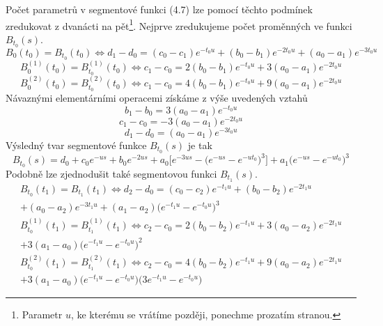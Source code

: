 \documentclass[a4paper]{book}
\begin{document}
Počet parametrů v segmentové funkci (4.7) lze pomocí těchto podmínek zredukovat z dvanácti na pět\footnote{Parametr $u$, ke kterému se vrátíme později, ponechme prozatím stranou.}. Nejprve zredukujeme počet proměnných ve funkci $B_{t_0}(s)$.
\begin{equation*}
B_0(t_0) = B_{t_0}(t_0) \Leftrightarrow d_1 - d_0 = (c_0 - c_1)e^{-t_0u} + (b_0 - b_1)e^{-2t_0u} + (a_0 - a_1)e^{-3t_0u}
\end{equation*}
\begin{equation*}
B_0^{(1)}(t_0) = B_{t_0}^{(1)}(t_0) \Leftrightarrow c_1 - c_0 = 2(b_0 - b_1)e^{-t_0u} + 3(a_0 - a_1)e^{-2t_0u}
\end{equation*}
\begin{equation*}
B_0^{(2)}(t_0) = B_{t_0}^{(2)}(t_0) \Leftrightarrow c_1 - c_0 = 4(b_0 - b_1)e^{-t_0u} + 9(a_0 - a_1)e^{-2t_0u}
\end{equation*}
Návaznými elementárními operacemi získáme z výše uvedených vztahů
\begin{equation*}
b_1 - b_0 = 3(a_0 - a_1)e^{-t_0u}
\end{equation*}
\begin{equation*}
c_1 - c_0 = -3(a_0 - a_1)e^{-2t_0u}
\end{equation*}
\begin{equation*}
d_1 - d_0 = (a_0 - a_1)e^{-3t_0u}
\end{equation*}
Výsledný tvar segmentové funkce $B_{t_0}(s)$ je tak
\begin{equation*}
B_{t_0}(s) = d_0 + c_0 e^{-us} + b_0e^{-2us} + a_0\Big[e^{-3us} - \Big(e^{-us} - e^{-ut_0} \Big)^3 \Big] + a_1\Big( e^{-us} - e^{-ut_0} \Big)^3
\end{equation*}
Podobně lze zjednodušit také segmentovou funkci $B_{t_1}(s)$.
\begin{equation*}
\begin{split}
B_{t_0}(t_1) = B_{t_1}(t_1) \Leftrightarrow d_2 - d_0 = (c_0 - c_2)e^{-t_1u} + (b_0 - b_2)e^{-2t_1u}\\ + (a_0 - a_2)e^{-3t_1u} + (a_1 - a_2)\Big( e^{-t_1u} - e^{-t_0 u} \Big)^3\\
B_{t_0}^{(1)}(t_1) = B_{t_1}^{(1)}(t_1) \Leftrightarrow c_2 - c_0 = 2(b_0 - b_2)e^{-t_1u} + 3(a_0 - a_2)e^{-2t_1u}\\
+ 3(a_1 - a_0)\Big( e^{-t_1u} - e^{-t_0u} \Big)^2
\end{split}
\end{equation*}
\begin{equation*}
\begin{split}
B_{t_0}^{(2)}(t_1) = B_{t_1}^{(2)}(t_1) \Leftrightarrow c_2 - c_0 = 4(b_0 - b_2)e^{-t_1u} + 9(a_0 - a_2)e^{-2t_1u}\\
+ 3(a_1 - a_0)\Big( e^{-t_1u} - e^{-t_0u} \Big) \Big( 3e^{-t_1u} - e^{-t_0u} \Big)
\end{split}
\end{equation*}
\end{document}
